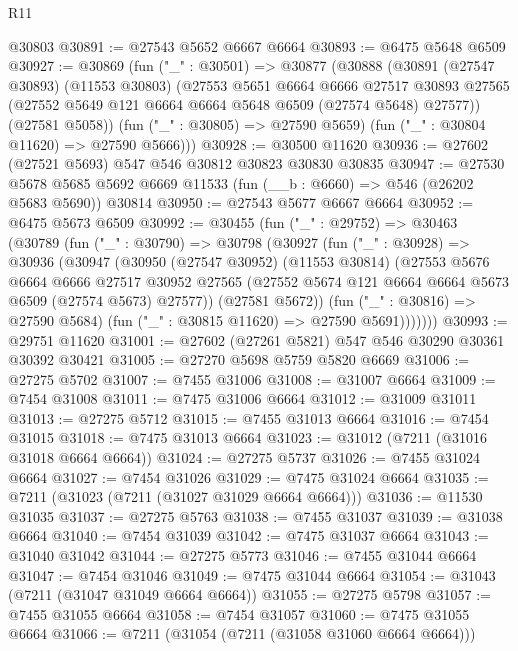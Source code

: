 \begin{lexlean}{R11}
\begin{coremodule}
    @30803
@30891 := @27543 @5652 @6667 @6664
@30893 := @6475 @5648 @6509
@30927 := @30869
    (fun ("_" : @30501) =>
    @30877
      (@30888
        (@30891
          (@27547 @30893)
          (@11553 @30803)
          (@27553
            @5651
            @6664
            @6666
            @27517
            @30893
            @27565
            (@27552 @5649 @121 @6664 @6664 @5648 @6509 (@27574 @5648) @27577))
          (@27581 @5058))
        (fun ("_" : @30805) => @27590 @5659)
        (fun ("_" : @30804 @11620) => @27590 @5666)))
@30928 := @30500 @11620
@30936 := @27602 (@27521 @5693) @547 @546 @30812 @30823 @30830 @30835
@30947 := @27530
    @5678
    @5685
    @5692
    @6669
    @11533
    (fun (__b : @6660) => @546 (@26202 @5683 @5690))
    @30814
@30950 := @27543 @5677 @6667 @6664
@30952 := @6475 @5673 @6509
@30992 := @30455
    (fun ("_" : @29752) =>
    @30463
      (@30789
        (fun ("_" : @30790) =>
        @30798
          (@30927
            (fun ("_" : @30928) =>
            @30936
              (@30947
                (@30950
                  (@27547 @30952)
                  (@11553 @30814)
                  (@27553
                    @5676
                    @6664
                    @6666
                    @27517
                    @30952
                    @27565
                    (@27552 @5674 @121 @6664 @6664 @5673 @6509 (@27574 @5673) @27577))
                  (@27581 @5672))
                (fun ("_" : @30816) => @27590 @5684)
                (fun ("_" : @30815 @11620) => @27590 @5691)))))))
@30993 := @29751 @11620
@31001 := @27602 (@27261 @5821) @547 @546 @30290 @30361 @30392 @30421
@31005 := @27270 @5698 @5759 @5820 @6669
@31006 := @27275 @5702
@31007 := @7455 @31006
@31008 := @31007 @6664
@31009 := @7454 @31008
@31011 := @7475 @31006 @6664
@31012 := @31009 @31011
@31013 := @27275 @5712
@31015 := @7455 @31013 @6664
@31016 := @7454 @31015
@31018 := @7475 @31013 @6664
@31023 := @31012 (@7211 (@31016 @31018 @6664 @6664))
@31024 := @27275 @5737
@31026 := @7455 @31024 @6664
@31027 := @7454 @31026
@31029 := @7475 @31024 @6664
@31035 := @7211 (@31023 (@7211 (@31027 @31029 @6664 @6664)))
@31036 := @11530 @31035
@31037 := @27275 @5763
@31038 := @7455 @31037
@31039 := @31038 @6664
@31040 := @7454 @31039
@31042 := @7475 @31037 @6664
@31043 := @31040 @31042
@31044 := @27275 @5773
@31046 := @7455 @31044 @6664
@31047 := @7454 @31046
@31049 := @7475 @31044 @6664
@31054 := @31043 (@7211 (@31047 @31049 @6664 @6664))
@31055 := @27275 @5798
@31057 := @7455 @31055 @6664
@31058 := @7454 @31057
@31060 := @7475 @31055 @6664
@31066 := @7211 (@31054 (@7211 (@31058 @31060 @6664 @6664)))

\end{coremodule}
\end{lexlean}
